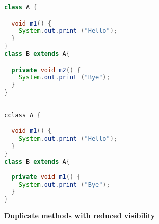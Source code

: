 \begin{figure}[th]
\centering
\begin{minipage}[t]{0.7\linewidth}
\begin{lstlisting}[language=java, basicstyle=\scriptsize\ttfamily,frame=single]
class A {

  void m1() {
    System.out.print ("Hello");
  }
}
class B extends A{

  private void m2() {
    System.out.print ("Bye");
  }	
}
 
\end{lstlisting}
\end{minipage}
\hfill
\begin{minipage}[t]{0.7\linewidth}
\begin{lstlisting}[language=java, basicstyle=\scriptsize\ttfamily,frame=single]
cclass A {

  void m1() {
    System.out.print ("Hello");
  }
}
class B extends A{
 
  private void m1() {
    System.out.print ("Bye");
  }	
}

\end{lstlisting}
\end{minipage}
\caption{\textbf{Duplicate methods with reduced visibility}}
\label{fig:RmR3}
\end{figure}